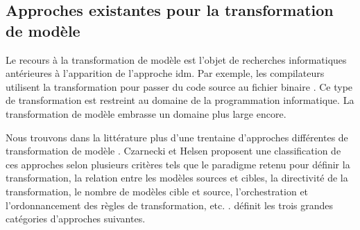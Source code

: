 \subsection{Approches existantes pour la transformation de modèle}  
Le recours à la transformation de modèle est l'objet de recherches informatiques 
antérieures à l'apparition de l'approche \gls{idm}. Par exemple, les compilateurs 
utilisent la transformation pour passer du code source au fichier binaire 
\cite{aho1985compilers}. Ce type de transformation est restreint au domaine de 
la programmation informatique. La transformation de modèle embrasse un domaine 
plus large encore.

Nous trouvons dans la littérature plus d'une trentaine d'approches différentes 
de transformation de modèle \cite{syriani2011multi}. Czarnecki et Helsen 
proposent une classification de ces approches selon plusieurs critères tels que 
le paradigme retenu pour définir la transformation, la relation entre les 
modèles sources et cibles, la directivité de la transformation, le nombre de 
modèles cible et source, l'orchestration et l'ordonnancement des règles de 
transformation, etc. \cite{czarnecki2006feature}. \cite{blanc2011mda} définit les trois grandes catégories d'approches suivantes.

